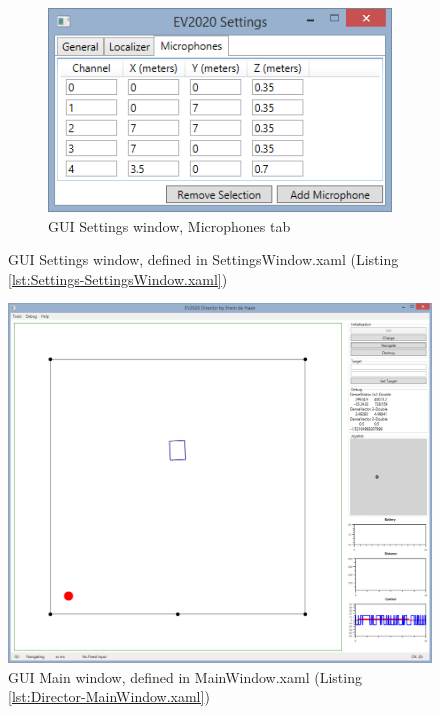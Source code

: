 \documentclass[final]{scrreprt} %
\begin{document}
\begin{appendices}
\begin{figure}[h]
\begin{subfigure}{0.5\linewidth}
	\includegraphics[width=\linewidth]{resources/UI-Settings-Microphones.png}
	\caption{GUI Settings window, Microphones tab}
	\label{fig:UI-Settings-Microphones}

\end{subfigure}
\caption{GUI Settings window, defined in SettingsWindow.xaml (Listing \ref{lst:Settings-SettingsWindow.xaml})}
\label{fig:UI-Settings}
\end{figure}

\begin{figure}[h]
\centering
	\includegraphics[width=0.9\linewidth]{resources/UI-Main.png}
	\caption{GUI Main window, defined in MainWindow.xaml (Listing \ref{lst:Director-MainWindow.xaml})}
	\label{fig:UI-Main}
\end{figure}


\end{appendices}
\end{document}
